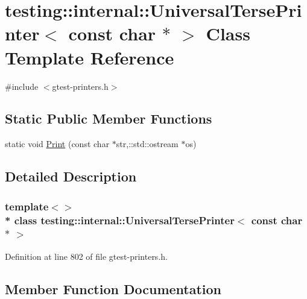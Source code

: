 \hypertarget{classtesting_1_1internal_1_1_universal_terse_printer_3_01const_01char_01_5_01_4}{}\section{testing\+:\+:internal\+:\+:Universal\+Terse\+Printer$<$ const char $\ast$ $>$ Class Template Reference}
\label{classtesting_1_1internal_1_1_universal_terse_printer_3_01const_01char_01_5_01_4}


{\ttfamily \#include $<$gtest-\/printers.\+h$>$}

\subsection*{Static Public Member Functions}
\begin{DoxyCompactItemize}
\item 
static void \hyperlink{classtesting_1_1internal_1_1_universal_terse_printer_3_01const_01char_01_5_01_4_aa7bc28677539f2f151e8fbcd9c573655}{Print} (const char $\ast$str,\+::std\+::ostream $\ast$os)
\end{DoxyCompactItemize}


\subsection{Detailed Description}
\subsubsection*{template$<$$>$\\*
class testing\+::internal\+::\+Universal\+Terse\+Printer$<$ const char $\ast$ $>$}



Definition at line 802 of file gtest-\/printers.\+h.



\subsection{Member Function Documentation}
